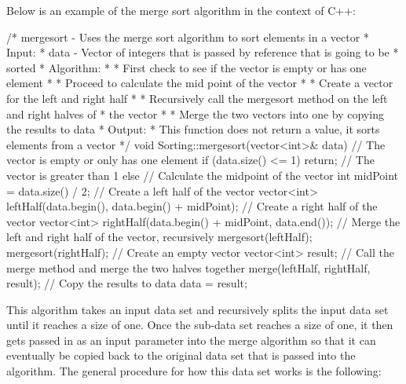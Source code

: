 \begin{highlight}
Below is an example of the merge sort algorithm in the context of C++:

\begin{code}
/*  mergesort - Uses the merge sort algorithm to sort elements in a vector
*   Input:
*     data - Vector of integers that is passed by reference that is going to be 
*             sorted
*   Algorithm:
*     * First check to see if the vector is empty or has one element
*     * Proceed to calculate the mid point of the vector
*     * Create a vector for the left and right half
*     * Recursively call the mergesort method on the left and right halves of 
*       the vector
*     * Merge the two vectors into one by copying the results to data
*   Output:
*     This function does not return a value, it sorts elements from a vector
*/
void Sorting::mergesort(vector<int>& data){
    // The vector is empty or only has one element
    if (data.size() <= 1) {
        return;
    }
    // The vector is greater than 1
    else {
        // Calculate the midpoint of the vector
        int midPoint = data.size() / 2;
        // Create a left half of the vector
        vector<int> leftHalf(data.begin(), data.begin() + midPoint);
        // Create a right half of the vector
        vector<int> rightHalf(data.begin() + midPoint, data.end());
        // Merge the left and right half of the vector, recursively
        mergesort(leftHalf);
        mergesort(rightHalf);
        // Create an empty vector
        vector<int> result;
        // Call the merge method and merge the two halves together
        merge(leftHalf, rightHalf, result);
        // Copy the results to data
        data = result;
    }
}
\end{code}

This algorithm takes an input data set and recursively splits the input data set until it reaches a size of one. Once the sub-data set reaches a size of one, it then gets passed in as an input parameter into the merge algorithm so that it can eventually be copied back to the original data set that is passed into the algorithm. The general procedure for how this data set works is the following:


\end{highlight}
